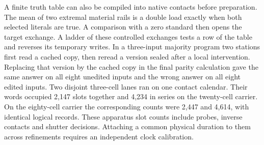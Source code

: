 \documentclass[11pt]{article}
\theoremstyle{remark}
\theoremstyle{plain}
\begin{document}
A finite truth table can also be compiled into native contacts before
preparation. The mean of two extremal material rails is a double load
exactly when both selected literals are true. A comparison with a zero
standard then opens the target exchange. A ladder of these controlled
exchanges tests a row of the table and reverses its temporary writes.
In a three-input majority program two stations first read a cached copy,
then reread a version sealed after a local intervention. Replacing that
version by the cached copy in the final parity calculation gave the same
answer on all eight unedited inputs and the wrong answer on all eight
edited inputs. Two disjoint three-cell lanes ran on one contact calendar.
Their words occupied 2,147 slots together and 4,234 in series on the
twenty-cell carrier. On the eighty-cell carrier the corresponding counts
were 2,447 and 4,614, with identical logical records. These apparatus
slot counts include probes, inverse contacts and shutter decisions.
Attaching a common physical duration to them across refinements requires
an independent clock calibration.
\end{document}
